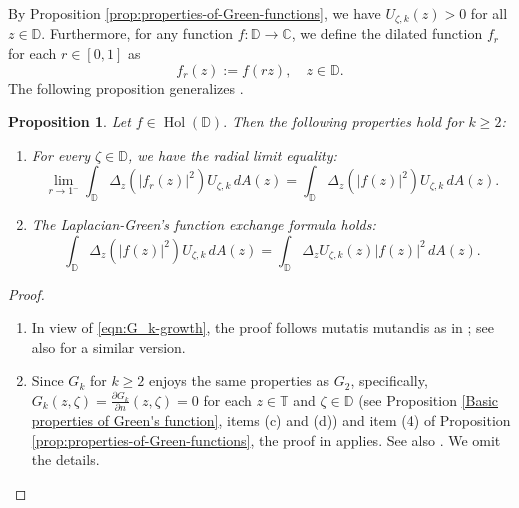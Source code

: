\documentclass[10pt,oneside,reqno]{amsart}
\newtheorem{proposition}[theorem]{Proposition}
\theoremstyle{definition}
\theoremstyle{remark}
\renewcommand{\ge}{\geqslant}
\newcommand{\C}{\mathbb C}
\newcommand{\D}{\mathbb D}
\newcommand{\T}{\mathbb T}
\numberwithin{equation}{section}
\begin{document}
By Proposition \ref{prop:properties-of-Green-functions}, we have $U_{\zeta, k}(z) > 0$ for all $z \in \mathbb{D}$. Furthermore, for any function $f \colon \D \to \C$, we define the dilated function $f_r$ for each $r \in [0,1]$ as  
\begin{equation*}
    f_r(z) := f(rz), \quad z \in \D.
\end{equation*}
The following proposition generalizes \cite[Proposition 2.4]{ARS96}. 
 \begin{proposition}
\label{prop:analytic-Gk-properties}
Let $f\in \operatorname{Hol} \left( \D \right).$  Then the following properties hold for $k \ge 2$:

\begin{enumerate}[label=(\roman*)]
\item[\rm (i)] For every $\zeta \in \D$, we have the radial limit equality:
\begin{equation*}
\lim_{r\to 1^-} \int_{\D} \Delta_z \left( |f_r(z)|^2 \right) U_{\zeta, k} \, dA(z) = \int_{\D} \Delta_z \left( |f(z)|^2 \right) U_{\zeta, k} \, dA(z).
\end{equation*}

\item[\rm(ii)] The Laplacian-Green's function exchange formula holds:
\begin{equation*}
\int_{\D} \Delta_z \left( |f(z)|^2 \right) U_{\zeta, k} \, dA(z) = \int_{\D} \Delta_z U_{\zeta, k} (z) |f(z)|^2 \, dA(z).
\end{equation*}
\end{enumerate}
  \end{proposition}
\begin{proof}

    \begin{enumerate}[label=(\roman*)]
        \item  In view of \eqref{eqn:G_k-growth}, the proof follows mutatis mutandis as in \cite[Proposition 2.4]{ARS96}; see also \cite[Ch. 9, Lemma 6]{DurenBergman} for a similar version.
        \item Since $G_k$ for $k \geq 2$ enjoys the same properties as $G_2$, specifically, $G_k(z, \zeta) = \frac{\partial G_k}{\partial n}(z, \zeta) = 0$ for each $z \in \T$ and $\zeta \in \D$ (see Proposition \ref{Basic properties of Green's function}, items (c) and (d)) and item (4) of Proposition \ref{prop:properties-of-Green-functions}, the proof in \cite[Proposition~2.4]{ARS96} applies. See also \cite[Ch.3, Proposition~3.18]{TheoryofBergmanJhu}. We omit the details.
    \end{enumerate}
\end{proof}
\end{document}

